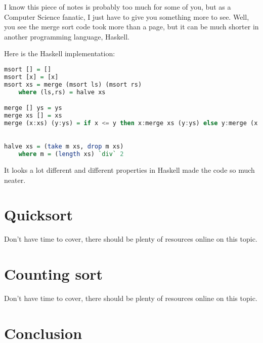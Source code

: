 I know this piece of notes is probably too much for some of you, but as a Computer Science fanatic, I just have to give you something more to see. Well, you see the merge sort code took more than a page, but it can be much shorter in another programming language, Haskell. 

Here is the Haskell implementation:

\begin{lstlisting}[language=Haskell]
msort [] = []
msort [x] = [x]
msort xs = merge (msort ls) (msort rs)
    where (ls,rs) = halve xs

merge [] ys = ys
merge xs [] = xs
merge (x:xs) (y:ys) = if x <= y then x:merge xs (y:ys) else y:merge (x:xs) ys
    

halve xs = (take m xs, drop m xs)
    where m = (length xs) `div` 2

\end{lstlisting}

It looks a lot different and different properties in Haskell made the code so much neater.

\section{Quicksort}

Don't have time to cover, there should be plenty of resources online on this topic.

\section{Counting sort}

Don't have time to cover, there should be plenty of resources online on this topic.

\section{Conclusion}

